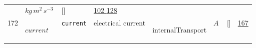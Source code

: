 \begin{longtable}{|p{1cm}|p{3cm}|p{3cm}|p{7cm}|p{3.0cm}|p{3cm}|p{2cm}|p{1cm}|}
             & $ kg \,m^{2} \,s^{-3} \, $
             & []
             & \hyperlink{"e:102"}{ 102 }
                 \hyperlink{"e:128"}{ 128 }
                 \\
    172
             & \hypertarget{"v:172"}{ $ {current}{_{}} $}
             & \verb|current|
             & electrical current
             & \begin{lay}internalTransport \end{lay}
             & $ A \, $
             & []
             & \hyperlink{"e:167"}{ 167 }
                 \\
    \end{longtable}